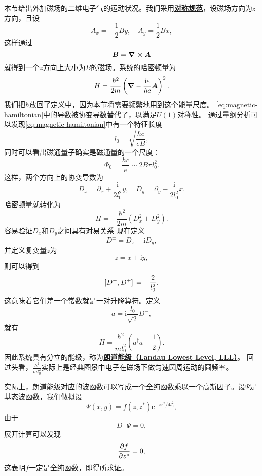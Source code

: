 \documentclass[hyperref, UTF8, a4paper]{ctexart}
\newcommand*{\ii}{\mathrm{i}}
\newcommand*{\ee}{\mathrm{e}}
\newcommand*{\concept}[1]{\underline{\textbf{#1}}}
\begin{document}
本节给出外加磁场的二维电子气的运动状况。我们采用\concept{对称规范}，设磁场方向为$z$方向，且设
\begin{equation}
    A_x = - \frac{1}{2} B y, \quad A_y = \frac{1}{2} B x,
\end{equation}
这样通过
\[
    \vb*{B} = \curl{\vb*{A}}
\]
就得到一个$z$方向上大小为$B$的磁场。系统的哈密顿量为
\begin{equation}
    {H} = \frac{\hbar^2}{2m} \left( \grad - \frac{\ii e}{\hbar c} \vb*{A} \right)^2.
    \label{eq:magnetic-hamiltonian}
\end{equation}
我们把$\hbar$放回了定义中，因为本节将需要频繁地用到这个能量尺度。
\eqref{eq:magnetic-hamiltonian}中的导数被协变导数替代了，以满足$U(1)$对称性。
通过量纲分析可以发现\eqref{eq:magnetic-hamiltonian}中有一个特征长度
\begin{equation}
    l_0 = \sqrt{\frac{\hbar c}{e B}},
\end{equation}
同时可以看出磁通量子确实是磁通量的一个尺度：
\[
    \Phi_0 = \frac{h c}{e} \sim 2 B \pi l_0^2.
\]
这样，两个方向上的协变导数为
\begin{equation}
    D_x = \partial_x + \frac{\ii}{2l_0^2} y, \quad D_y = \partial_y - \frac{\ii}{2l_0^2}x.
\end{equation}
哈密顿量就转化为
\[
    {H} = - \frac{\hbar^2}{2m} (D_x^2 + D_y^2).
\]
容易验证$D_x$和$D_y$之间具有对易关系
现在定义
\begin{equation}
    D^\pm = D_x \pm \ii D_y,
\end{equation}
并定义复变量$z$为
\begin{equation}
    z = x + \ii y,
\end{equation}
则可以得到
\begin{equation}
    \comm*{D^-}{D^+} = - \frac{2}{l_0^2}.
\end{equation}
这意味着它们差一个常数就是一对升降算符。定义
\begin{equation}
    {a} = \ii \frac{l_0}{\sqrt{2}} D^-,
\end{equation}
就有
\begin{equation}
    {H} = \frac{\hbar^2}{m l_0^2} \left({a}^\dagger {a} + \frac{1}{2} \right).
\end{equation}
因此系统具有分立的能级，称为\concept{朗道能级（Landau Lowest Level, LLL）}。
回过头看，$\frac{\hbar^2}{m l_0^2}$实际上是经典图景中电子在磁场下做匀速圆周运动的圆频率。

实际上，朗道能级对应的波函数可以写成一个全纯函数乘以一个高斯因子。设$\Psi$是基态波函数，我们做拟设
\begin{equation}
    \Psi(x, y) = f(z, z^*) \ee^{- z z^* / 4l_0^2},
    \label{eq:landau-wave-packet}
\end{equation}
由于
\[
    D^- \Psi = 0,
\]
展开计算可以发现
\[
    \pdv{f}{z^*} = 0,
\]
这表明$f$一定是全纯函数，即得所求证。
\end{document}
